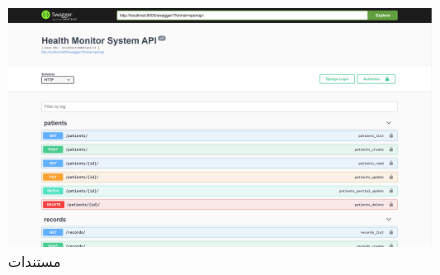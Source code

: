 \begin{figure}[h]
	\centering
	\includegraphics[width=1.0\textwidth]{figs/swagger.png}
	
	\caption{مستندات }
	\label{fig:8}
\end{figure}


